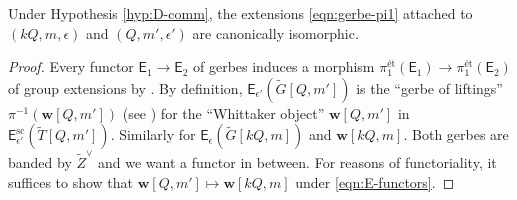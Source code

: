 \documentclass[a4paper,10pt]{article}
\begin{document}
\begin{lemma}\label{prop:rescale-gerbe}
	Under Hypothesis \ref{hyp:D-comm}, the extensions \eqref{eqn:gerbe-pi1} attached to $(kQ,m,\epsilon)$ and $(Q,m',\epsilon')$ are canonically isomorphic.
\end{lemma}
\begin{proof}
	Every functor $\mathsf{E}_1 \to \mathsf{E}_2$ of gerbes induces a morphism $\pi_1^{\text{ét}}(\mathsf{E}_1) \to \pi_1^{\text{ét}}(\mathsf{E}_2)$ of group extensions by \cite[\S 19.4]{Weis17}. By definition, $\mathsf{E}_{\epsilon'}(\tilde{G}[Q, m'])$ is the ``gerbe of liftings'' $\pi^{-1}(\bm{w}[Q, m'])$ (see \cite[\S 19.3.3]{Weis17}) for the ``Whittaker object'' $\bm{w}[Q, m']$ in $\mathsf{E}_{\epsilon'}^\text{sc}(\tilde{T}[Q, m'])$. Similarly for $\mathsf{E}_\epsilon(\tilde{G}[kQ,m])$ and $\bm{w}[kQ, m]$. Both gerbes are banded by $\tilde{Z}^\vee$ and we want a functor in between. For reasons of functoriality, it suffices to show that $\bm{w}[Q, m'] \mapsto \bm{w}[kQ, m]$ under \eqref{eqn:E-functors}.
	

\end{proof}
\end{document}
